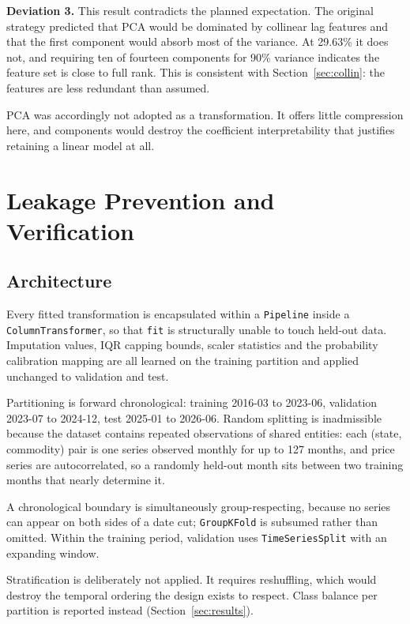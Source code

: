 \documentclass[conference]{IEEEtran}
\begin{document}
\textbf{Deviation 3.} This result contradicts the planned expectation. The
original strategy predicted that PCA would be dominated by collinear lag
features and that the first component would absorb most of the variance. At
29.63\% it does not, and requiring ten of fourteen components for 90\% variance
indicates the feature set is close to full rank. This is consistent with
Section~\ref{sec:collin}: the features are less redundant than assumed.

PCA was accordingly not adopted as a transformation. It offers little
compression here, and components would destroy the coefficient
interpretability that justifies retaining a linear model at all.

\section{Leakage Prevention and Verification}
\label{sec:leak}

\subsection{Architecture}

Every fitted transformation is encapsulated within a \texttt{Pipeline} inside a
\texttt{ColumnTransformer}, so that \texttt{fit} is structurally unable to
touch held-out data. Imputation values, IQR capping bounds, scaler statistics
and the probability calibration mapping are all learned on the training
partition and applied unchanged to validation and test.

Partitioning is forward chronological: training 2016-03 to 2023-06, validation
2023-07 to 2024-12, test 2025-01 to 2026-06. Random splitting is inadmissible
because the dataset contains repeated observations of shared entities: each
(state, commodity) pair is one series observed monthly for up to 127 months,
and price series are autocorrelated, so a randomly held-out month sits between
two training months that nearly determine it.

A chronological boundary is simultaneously group-respecting, because no series
can appear on both sides of a date cut; \texttt{GroupKFold} is subsumed rather
than omitted. Within the training period, validation uses
\texttt{TimeSeriesSplit} with an expanding window.

Stratification is deliberately not applied. It requires reshuffling, which
would destroy the temporal ordering the design exists to respect. Class balance
per partition is reported instead (Section~\ref{sec:results}).
\end{document}
